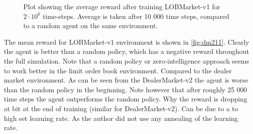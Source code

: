 \documentclass{kththesis}
\theoremstyle{definition}
\begin{document}
\begin{figure}[H]
	    	\centering
		
		\caption{Plot showing the average reward after training LOBMarket-v1 for $2\cdot 10^{6}$ time-steps. Average is taken after 10 000 time steps, compared to a random agent on the same environment.}
		\label{fig:dm211}
\end{figure}
The mean reward for LOBMarket-v1 environment is shown in \autoref{fig:dm211}. Clearly the agent is better than a random policy, which has a negative reward throughout the full simulation. Note that a random policy or zero-intelligence approach seems to work better in the limit order book environment. Compared to the dealer market environment. As can be seen from the DealerMarket-v2 the agent is worse than the random policy in the beginning. Note however that after roughly 25 000 time steps the agent outperforms the random policy. Why the reward is dropping at bit at the end of training (similar for DealerMarket-v2). Can be due to a to high set learning rate. As the author did not use  any annealing of the learning rate.


\newpage
\end{document}
